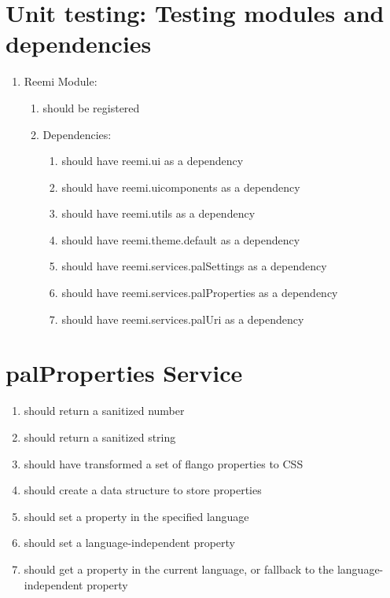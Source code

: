 \begin{singlespace}
\section{Unit testing: Testing modules and dependencies}
\begin{enumerate}
\item     Reemi Module:
\begin{enumerate}
\item         should be registered
\item         Dependencies:
\begin{enumerate}
\item             should have reemi.ui as a dependency
\item             should have reemi.uicomponents as a dependency
\item             should have reemi.utils as a dependency
\item             should have reemi.theme.default as a dependency
\item             should have reemi.services.palSettings as a dependency
\item             should have reemi.services.palProperties as a dependency
\item             should have reemi.services.palUri as a dependency
\end{enumerate}
\end{enumerate}
\end{enumerate}

\section{palProperties Service}
\begin{enumerate}
\item         should return a sanitized number
\item         should return a sanitized string
\item         should have transformed a set of flango properties to CSS
\item         should create a data structure to store properties
\item         should set a property in the specified language
\item         should set a language-independent property
\item         should get a property in the current language, or fallback to the language-independent property
\end{enumerate}


\end{singlespace}
